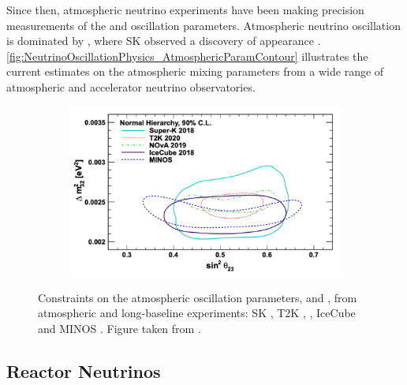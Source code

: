 Since then, atmospheric neutrino experiments have been making precision measurements of the  and  oscillation parameters.
Atmospheric neutrino oscillation is dominated by , where SK observed a \quickmath{4.6\sigma} discovery of \quickmath{\nu_{\tau}} appearance \cite{Li_2018}. \autoref{fig:NeutrinoOscillationPhysics_AtmosphericParamContour} illustrates the current estimates on the atmospheric mixing parameters from a wide range of atmospheric and accelerator neutrino observatories.

\begin{figure}[h]
  \begin{subfigure}[t]{0.90\textwidth}
    \includegraphics[width=\textwidth, trim={0mm 0mm 0mm 0mm}, clip,page=1]{Figures/Theory/AtmosphericParams.pdf}
  \end{subfigure}
  \caption{Constraints on the atmospheric oscillation parameters,  and , from atmospheric and long-baseline experiments: SK \cite{Kamiokande_Collaboration2017-nf}, T2K \cite{T2K_Collaboration2018-sm},  \cite{Acero2019-rw}, IceCube \cite{Aartsen2018-cz} and MINOS \cite{Adamson2014-tt}. Figure taken from \cite{Athar_2022}.}
  \label{fig:NeutrinoOscillationPhysics_AtmosphericParamContour}
\end{figure}

\subsection{Reactor Neutrinos}
\label{subsec:NeutrinoOscillationPhysics_ReactorNeutrinos}

